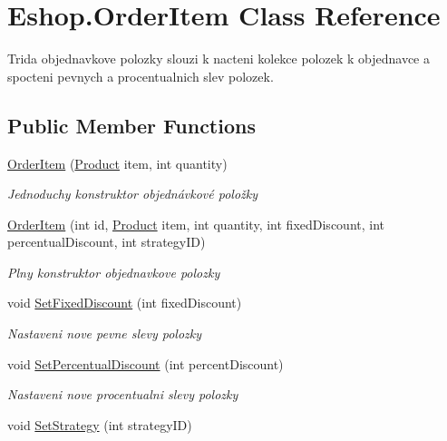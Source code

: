 \hypertarget{class_eshop_1_1_order_item}{}\section{Eshop.\+Order\+Item Class Reference}
\label{class_eshop_1_1_order_item}


Trida objednavkove polozky slouzi k nacteni kolekce polozek k objednavce a spocteni pevnych a procentualnich slev polozek.  


\subsection*{Public Member Functions}
\begin{DoxyCompactItemize}
\item 
\mbox{\hyperlink{class_eshop_1_1_order_item_a85aa0a0b80bfc8399f34a5cec4a4da40}{Order\+Item}} (\mbox{\hyperlink{class_eshop_1_1_product}{Product}} item, int quantity)
\begin{DoxyCompactList}\small\item\em Jednoduchy konstruktor objednávkové položky \end{DoxyCompactList}\item 
\mbox{\hyperlink{class_eshop_1_1_order_item_ac9751e73e7b9d2864869eee19a0fa5ba}{Order\+Item}} (int id, \mbox{\hyperlink{class_eshop_1_1_product}{Product}} item, int quantity, int fixed\+Discount, int percentual\+Discount, int strategy\+ID)
\begin{DoxyCompactList}\small\item\em Plny konstruktor objednavkove polozky \end{DoxyCompactList}\item 
void \mbox{\hyperlink{class_eshop_1_1_order_item_a7d3dbf9b8a436fbd1977a724c6ea8b83}{Set\+Fixed\+Discount}} (int fixed\+Discount)
\begin{DoxyCompactList}\small\item\em Nastaveni nove pevne slevy polozky \end{DoxyCompactList}\item 
void \mbox{\hyperlink{class_eshop_1_1_order_item_a75b364576208053e051406bae275cd22}{Set\+Percentual\+Discount}} (int percent\+Discount)
\begin{DoxyCompactList}\small\item\em Nastaveni nove procentualni slevy polozky \end{DoxyCompactList}\item 
void \mbox{\hyperlink{class_eshop_1_1_order_item_a8c45b7ee6da0b23934c7977cadba9017}{Set\+Strategy}} (int strategy\+ID)

\end{DoxyCompactItemize}

